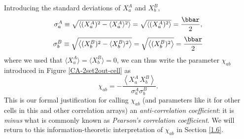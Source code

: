 Introducing the standard deviations of $X_a^A$ and $X_b^B$,
\begin{equation}
\begin{array}{c}
\sigma^A_a \equiv \sqrt{ \left\langle (X^A_a)^2 - \langle X_a^A \rangle^2 \right\rangle} = \sqrt{ \left\langle (X^A_a)^2 \right\rangle }= \displaystyle{\frac{\bbar}{2}},    \\[.4cm]
\sigma^B_b \equiv  \sqrt{ \left\langle (X^B_b)^2 - \langle X_b^B \rangle^2 \right\rangle} = \sqrt{ \left\langle (X^B_b)^2 \right\rangle }= \displaystyle{\frac{\bbar}{2}}  
\end{array}
\label{standard deviations a and b}
\end{equation}
where we used that $\langle X_a^A \rangle = \langle X_b^B \rangle = 0$, we can thus write the parameter $\chi_{ab}$  introduced in Figure \ref{CA-2set2out-cell} as
\begin{equation}
\chi_{ab} = - \frac{\left\langle X_a^A \, X_b^B \right\rangle}{\sigma^A_a \sigma^B_b}. 
\label{chi as corr coef}
\end{equation}
This is our formal justification for calling $\chi_{ab}$ (and parameters like it for other cells in this and other correlation arrays) an \emph{anti-correlation coefficient}: it is \emph{minus} what is commonly known as \emph{Pearson's correlation coefficient}. We will return to this information-theoretic interpretation of $\chi_{ab}$ in Section  \ref{1.6}.

